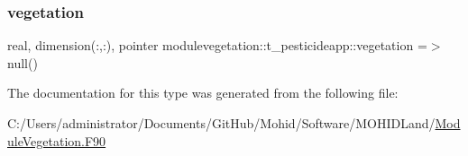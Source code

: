 \mbox{\label{structmodulevegetation_1_1t__pesticideapp_afa67ac536196a959216f348cef8826fe}} 
\subsubsection{\texorpdfstring{vegetation}{vegetation}}
{\footnotesize\ttfamily real, dimension(\+:,\+:), pointer modulevegetation\+::t\+\_\+pesticideapp\+::vegetation =$>$ null()\hspace{0.3cm}{\ttfamily [private]}}



The documentation for this type was generated from the following file\+:\begin{DoxyCompactItemize}
\item 
C\+:/\+Users/administrator/\+Documents/\+Git\+Hub/\+Mohid/\+Software/\+M\+O\+H\+I\+D\+Land/\mbox{\hyperlink{_module_vegetation_8_f90}{Module\+Vegetation.\+F90}}\end{DoxyCompactItemize}
